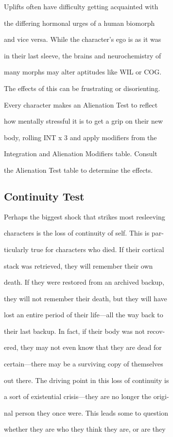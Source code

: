 Uplifts often have difficulty getting acquainted with 

the differing hormonal urges of a human biomorph 

and vice versa. While the character's ego is as it was 

in their last sleeve, the brains and neurochemistry of 

many morphs may alter aptitudes like WIL or COG. 

The effects of this can be frustrating or disorienting.

Every character makes an Alienation Test to reflect 

how mentally stressful it is to get a grip on their new 

body, rolling INT x 3 and apply modifiers from the 

Integration and Alienation Modifiers table. Consult 

the Alienation Test table to determine the effects.

\subsection{Continuity Test}


Perhaps the biggest shock that strikes most resleeving 

characters is the loss of continuity of self. This is par-

ticularly true for characters who died. If their cortical 

stack was retrieved, they will remember their own 

death. If they were restored from an archived backup, 

they will not remember their death, but they will have 

lost an entire period of their life—all the way back to 

their last backup. In fact, if their body was not recov-

ered, they may not even know that they are dead for 

certain—there may be a surviving copy of themselves 

out there. The driving point in this loss of continuity is 

a sort of existential crisis—they are no longer the origi-

nal person they once were. This leads some to question 

whether they are who they think they are, or are they 

